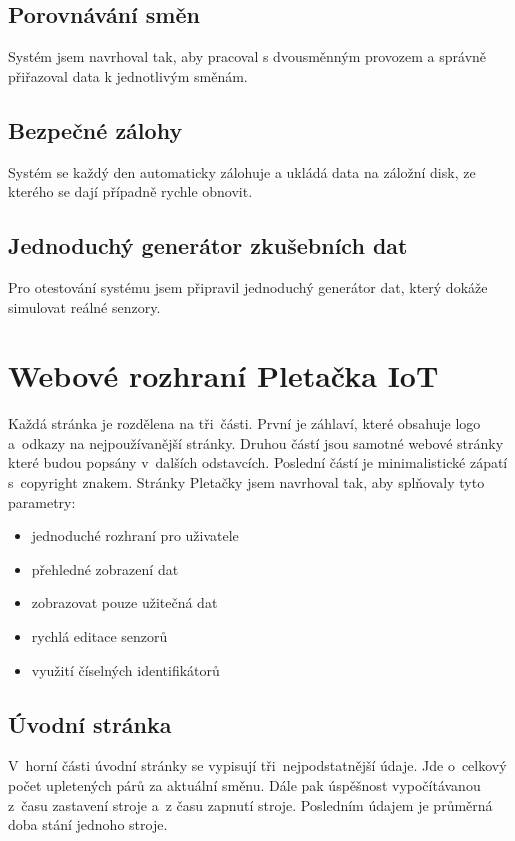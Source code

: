 \subsection{Porovnávání směn}
Systém jsem navrhoval tak, aby pracoval s dvousměnným provozem a správně přiřazoval data k jednotlivým směnám.


\subsection{Bezpečné zálohy}
Systém se každý den automaticky zálohuje a ukládá data na záložní disk, ze kterého se dají případně rychle obnovit.


\subsection{Jednoduchý generátor zkušebních dat}
Pro otestování systému jsem připravil jednoduchý generátor dat, který dokáže simulovat reálné senzory.



\section{Webové rozhraní Pletačka IoT}
Každá stránka je rozdělena na tři~části. První je záhlaví, které obsahuje logo a~odkazy na nejpoužívanější stránky.
Druhou částí jsou samotné webové stránky které budou popsány v~dalších odstavcích.
Poslední částí je minimalistické zápatí s~copyright znakem.\newline
Stránky Pletačky jsem navrhoval tak, aby splňovaly tyto parametry:

\begin{itemize}
    \item jednoduché rozhraní pro uživatele
    \item přehledné zobrazení dat
    \item zobrazovat pouze užitečná dat
    \item rychlá editace senzorů
    \item využití číselných identifikátorů
\end{itemize}


\subsection{Úvodní stránka}
V~horní části úvodní stránky se vypisují tři~nejpodstatnější údaje.
Jde o~celkový počet upletených párů za aktuální směnu.
Dále pak úspěšnost vypočítávanou z~času zastavení stroje a~z času zapnutí stroje.
Posledním údajem je průměrná doba stání jednoho stroje.   

